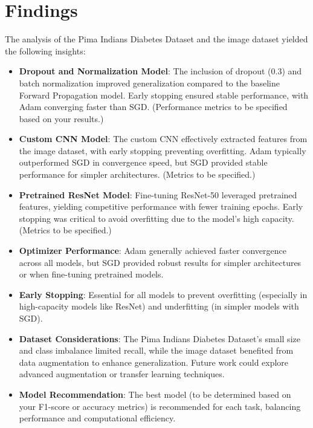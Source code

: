 \documentclass[a4paper,12pt]{article}
\begin{document}
\section*{Findings}
The analysis of the Pima Indians Diabetes Dataset and the image dataset yielded the following insights:

\begin{itemize}
    \item \textbf{Dropout and Normalization Model}: The inclusion of dropout (0.3) and batch normalization improved generalization compared to the baseline Forward Propagation model. Early stopping ensured stable performance, with Adam converging faster than SGD. (Performance metrics to be specified based on your results.)
    
    \item \textbf{Custom CNN Model}: The custom CNN effectively extracted features from the image dataset, with early stopping preventing overfitting. Adam typically outperformed SGD in convergence speed, but SGD provided stable performance for simpler architectures. (Metrics to be specified.)
    
    \item \textbf{Pretrained ResNet Model}: Fine-tuning ResNet-50 leveraged pretrained features, yielding competitive performance with fewer training epochs. Early stopping was critical to avoid overfitting due to the model’s high capacity. (Metrics to be specified.)
    
    \item \textbf{Optimizer Performance}: Adam generally achieved faster convergence across all models, but SGD provided robust results for simpler architectures or when fine-tuning pretrained models.
    
    \item \textbf{Early Stopping}: Essential for all models to prevent overfitting (especially in high-capacity models like ResNet) and underfitting (in simpler models with SGD).
    
    \item \textbf{Dataset Considerations}: The Pima Indians Diabetes Dataset’s small size and class imbalance limited recall, while the image dataset benefited from data augmentation to enhance generalization. Future work could explore advanced augmentation or transfer learning techniques.
    
    \item \textbf{Model Recommendation}: The best model (to be determined based on your F1-score or accuracy metrics) is recommended for each task, balancing performance and computational efficiency.
\end{itemize}
\end{document}

